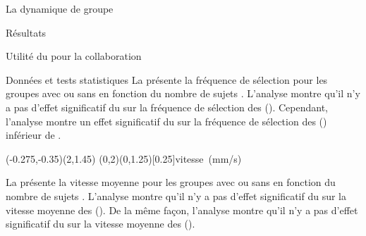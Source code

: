\documentclass[myfrancais,ngerman,english,frenchb]{mythesis}
\begin{document}
\begin{mychapter}{La dynamique de groupe}
\begin{mysection}{Résultats}
\begin{mysubsection}{Utilité du \mybrainstorming pour la collaboration}
\begin{mysubsubsection}{Données et tests statistiques}
					La  présente la fréquence de sélection  pour les groupes avec ou sans \mybrainstorming {} en fonction du nombre de sujets .
					L'analyse montre qu'il n'y a pas d'effet significatif du \mybrainstorming {} sur la fréquence de sélection  des  ().
					Cependant, l'analyse montre un effet significatif du \mybrainstorming {} sur la fréquence de sélection  des  () inférieur de .

					\begin{myfigure}
						\begin{myps}(-0.275,-0.35)(2,1.45)
							\myaxes(0,2){\mybrainstorming}(0,1.25)[0.25]{vitesse~(mm/s)}
						\end{myps}
					\end{myfigure}

					La  présente la vitesse moyenne  pour les groupes avec ou sans \mybrainstorming {} en fonction du nombre de sujets .
					L'analyse montre qu'il n'y a pas d'effet significatif du \mybrainstorming {} sur la vitesse moyenne  des  ().
					De la même façon, l'analyse montre qu'il n'y a pas d'effet significatif du \mybrainstorming {} sur la vitesse moyenne  des  ().


\end{mysubsubsection}
\end{mysubsection}
\end{mysection}
\end{mychapter}
\end{document}
